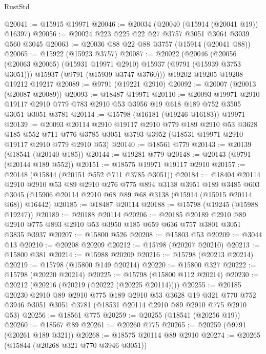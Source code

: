 \begin{lexlean}{RustStd}
\begin{coremodule}
@20041 := @15915 @19971
@20046 := @20034 (@20040 (@15914 (@20041 @19)) @16397)
@20056 := @20024 @223 @225 @22 @27 @3757 @3051 @3064 @3039 @560 @3045
@20063 := @20036 @88 @22 @88 @3757 (@15914 (@20041 @88))
@20065 := @15922 (@15923 @3757)
@20087 := @20022
    (@20046
      (@20056 (@20063 @20065) (@15931 @19971 @2910) @15937 (@9791 (@15939 @3753 @3051)))
      @15937
      (@9791 (@15939 @3747 @3760)))
    @19202
    @19205
    @19208
    @19212
    @19217
@20089 := @9791 (@19221 @2910)
@20092 := @20007 (@20013 (@20087 @20089))
@20093 := @18487 @19971
@20110 := @20093
    @19971
    @2910
    @19117
    @2910
    @779
    @783
    @2910
    @53
    @3956
    @19
    @618
    @189
    @752
    @3505
    @3051
    @3051
    @3781
@20114 := @15798 (@16181 (@19246 @16183)) @19971
@20139 := @20093
    @20114
    @2910
    @19117
    @2910
    @779
    @189
    @2910
    @53
    @3628
    @185
    @552
    @711
    @776
    @3785
    @3051
    @3793
    @3952
    (@18531 @19971 @2910 @19117 @2910 @779 @2910 @53)
@20140 := @18561 @779
@20143 := @20139 (@18541 (@20140 @185))
@20144 := @19281 @779
@20148 := @20143 (@9791 (@20144 @189 @552))
@20151 := @18575 @19971 @19117 @2910
@20157 := @20148 (@15844 (@20151 @552 @711 @3785 @3051))
@20184 := @18404
    @20114
    @2910
    @2910
    @53
    @89
    @2910
    @276
    @775
    @894
    @3138
    @3951
    @189
    @3485
    @603
    @3045
    (@15906 @20114 @2910 @68 @89 @68 @3138 (@15914 (@15915 @20114 @68)) @16442)
@20185 := @18487 @20114
@20188 := @15798 (@19245 (@15988 @19247))
@20189 := @20188 @20114
@20206 := @20185
    @20189
    @2910
    @89
    @2910
    @775
    @893
    @2910
    @53
    @3950
    @185
    @659
    @636
    @757
    @3801
    @3051
    @3835
    @3937
@20207 := @15800 @526
@20208 := @15803 @53
@20209 := @3044 @13
@20210 := @20208 @20209
@20212 := @15798 (@20207 @20210)
@20213 := @15800 @381
@20214 := @15988 @20209
@20216 := @15798 (@20213 @20214)
@20219 := @15798 (@15800 @149 @20214)
@20220 := @15800 @327
@20222 := @15798 (@20220 @20214)
@20225 := @15798 (@15800 @112 @20214)
@20230 := @20212 (@20216 (@20219 (@20222 (@20225 @20114))))
@20255 := @20185
    @20230
    @2910
    @89
    @2910
    @775
    @189
    @2910
    @53
    @3628
    @19
    @321
    @770
    @752
    @3946
    @3051
    @3051
    @3781
    (@18531 @20114 @2910 @89 @2910 @775 @2910 @53)
@20256 := @18561 @775
@20259 := @20255 (@18541 (@20256 @19))
@20260 := @18567 @89
@20261 := @20260 @775
@20265 := @20259 (@9791 (@20261 @189 @321))
@20268 := @18575 @20114 @89 @2910
@20274 := @20265 (@15844 (@20268 @321 @770 @3946 @3051))

\end{coremodule}
\end{lexlean}

